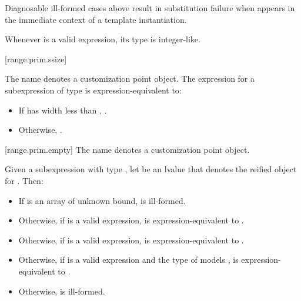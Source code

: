 \pnum
\begin{note}
Diagnosable ill-formed cases above
result in substitution failure when 
appears in the immediate context of a template instantiation.
\end{note}

\pnum
\begin{note}
Whenever  is a valid expression, its
type is integer-like.
\end{note}

[range.prim.ssize]{}
%

\pnum
The name  denotes
a customization point object.
The expression 
for a subexpression  of type 
is expression-equivalent to:

\begin{itemize}
\item
If  has width less than ,
.

\item
Otherwise,
.
\end{itemize}

[range.prim.empty]{}
\pnum
The name  denotes a customization point
object.

\pnum
Given a subexpression  with type ,
let  be an lvalue that denotes the reified object for .
Then:

\begin{itemize}
\item
  If  is an array of unknown bound,
   is ill-formed.

\item
  Otherwise, if  is a valid expression,
   is expression-equivalent to
  .

\item
  Otherwise, if  is a valid expression,
   is expression-equiva\-lent to
  .

\item
  Otherwise, if 
  is a valid expression and
  the type of  models ,
   is expression-equivalent to
  .

\item
  Otherwise,  is ill-formed.
\end{itemize}

